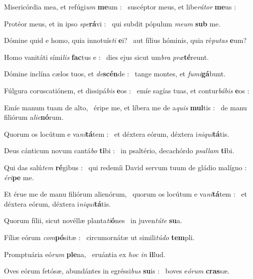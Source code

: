 \documentclass[12pt]{article} %
\newenvironment{psalmtext}{\leftskip 0.25in}{\vspace{1 mm}}
\let\oldgresixstar\gresixstar
\renewcommand{\gresixstar}{\textcolor{benred8}{\oldgresixstar}}
\let\oldgredagger\gredagger
\renewcommand{\gredagger}{\textcolor{benred8}{\oldgredagger}}
\begin{document}
\begin{psalmtext}
Misericórdia mea, et refúgi\emph{um} \textbf{me}um : \gresixstar\ suscéptor meus, et libe\emph{rátor} \textbf{me}us :

Protéor meus, et in ipso \emph{spe}\textbf{rá}vi : \gresixstar\ qui subdit pópulum \emph{meum} \textbf{sub} me.

Dómine quid e homo, quia innotuís\emph{ti} \textbf{e}i? \gresixstar\ aut fílius hóminis, quia ré\emph{putas} \textbf{e}um?

Homo vanitáti sími\emph{lis} \textbf{fac}tus e : \gresixstar\ dies ejus sicut um\emph{bra præ}\textbf{té}reunt.

Dómine inclína cælos tuos, et \emph{de}\textbf{scén}de : \gresixstar\ tange montes, et \emph{fumi}\textbf{gá}bunt.

Fúlgura coruscatiónem, et dissipá\emph{bis} \textbf{e}os : \gresixstar\ emíe sagías tuas, et contur\emph{bábis} \textbf{e}os :

Emíe manum tuam de alto, \gredagger\ éripe me, et líbera me de a\emph{quis} \textbf{mul}tis : \gresixstar\ de manu filiórum a\emph{lie}\textbf{nó}rum.

Quorum os locútum e va\emph{ni}\textbf{tá}tem : \gresixstar\ et déxtera eórum, déxtera i\emph{niqui}\textbf{tá}tis.

Deus cánticum novum cantá\emph{bo} \textbf{ti}bi : \gresixstar\ in psaltério, decachórdo \emph{psallam} \textbf{ti}bi.

Qui das salú\emph{tem} \textbf{ré}gibus : \gresixstar\ qui redemíi David servum tuum de gládio malígno : \emph{éri}\textbf{pe} me.

Et érue me de manu filiórum alienórum, \gredagger\ quorum os locútum e va\emph{ni}\textbf{tá}tem : \gresixstar\ et déxtera eórum, déxtera i\emph{niqui}\textbf{tá}tis.

Quorum fílii, sicut novéllæ planta\emph{ti}\textbf{ó}nes \gresixstar\ in juven\emph{túte} \textbf{su}a.

Fíliæ eórum \emph{com}\textbf{pó}sitæ : \gresixstar\ circumornátæ ut simili\emph{túdo} \textbf{tem}pli.

Promptuária eó\emph{rum} \textbf{ple}na, \gresixstar\ eruántia ex \emph{hoc in} \textbf{il}lud.

Oves eórum fetósæ, abundántes in egréssi\emph{bus} \textbf{su}is : \gresixstar\ boves e\emph{órum} \textbf{cras}sæ.


\end{psalmtext}
\end{document}
